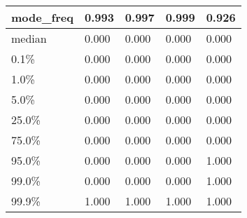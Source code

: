 \begin{table}[H]
\begin{tabular}{|l|m{10em}|m{10em}|m{10em}|m{10em}|}
\hline mode\_freq & 0.993 & 0.997 & 0.999 & 0.926 \\
\hline median & 0.000 & 0.000 & 0.000 & 0.000 \\
\hline 0.1\% & 0.000 & 0.000 & 0.000 & 0.000 \\
\hline 1.0\% & 0.000 & 0.000 & 0.000 & 0.000 \\
\hline 5.0\% & 0.000 & 0.000 & 0.000 & 0.000 \\
\hline 25.0\% & 0.000 & 0.000 & 0.000 & 0.000 \\
\hline 75.0\% & 0.000 & 0.000 & 0.000 & 0.000 \\
\hline 95.0\% & 0.000 & 0.000 & 0.000 & 1.000 \\
\hline 99.0\% & 0.000 & 0.000 & 0.000 & 1.000 \\
\hline 99.9\% & 1.000 & 1.000 & 1.000 & 1.000 \\
\hline
\end{tabular}
\end{table}

